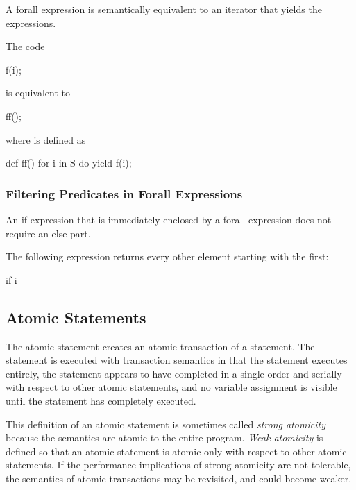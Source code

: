 A forall expression is semantically equivalent to an iterator that
yields the expressions.

\begin{example}
The code
\begin{chapel}
[i in S] f(i);
\end{chapel}
is equivalent to
\begin{chapel}
ff();
\end{chapel}
where  is defined as
\begin{chapel}
def ff() {
  for i in S do
    yield f(i);
}
\end{chapel}
\end{example}

\subsubsection{Filtering Predicates in Forall Expressions}
\label{Filtering_Predicates_Forall}

An if expression that is immediately enclosed by a forall expression
does not require an else part.
\begin{example}
The following expression returns every other element starting with the
first:
\begin{chapel}
[i in 1..s.length] if i %
\end{chapel}
\end{example}

\subsection{Atomic Statements}
\label{Atomic_Transactions}
\label{atomicity}

The atomic statement creates an atomic transaction of a statement. The
statement is executed with transaction semantics in that the statement
executes entirely, the statement appears to have completed in a single
order and serially with respect to other atomic statements, and no
variable assignment is visible until the statement has completely
executed.

This definition of an atomic statement is sometimes called {\em strong
atomicity} because the semantics are atomic to the entire program.
{\em Weak atomicity} is defined so that an atomic statement is atomic
only with respect to other atomic statements.  If the performance
implications of strong atomicity are not tolerable, the semantics of
atomic transactions may be revisited, and could become weaker.

